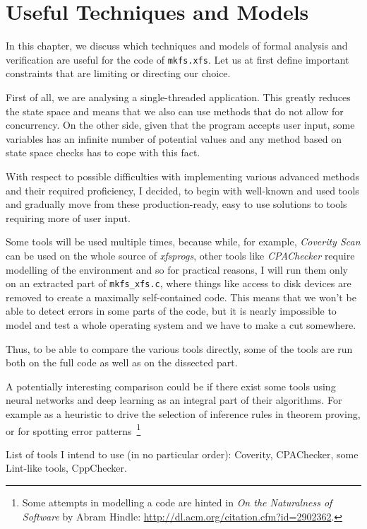 
\chapter{Useful Techniques and Models}\label{chap:techniques}
In this chapter, we discuss which techniques and models of formal analysis and verification are useful for the code of {\tt mkfs.xfs}. Let us at first define important constraints that are limiting or directing our choice.

First of all, we are analysing a single-threaded application. This greatly reduces the state space and means that we also can use methods that do not allow for concurrency. On the other side, given that the program accepts user input, some variables has an infinite number of potential values and any method based on state space checks has to cope with this fact.

With respect to possible difficulties with implementing various advanced methods and their required proficiency, I decided, to begin with well-known and used tools and gradually move from these production-ready, easy to use solutions to tools requiring more of user input.

Some tools will be used multiple times, because while, for example, {\em Coverity Scan} can be used on the whole source of {\em xfsprogs}, other tools like {\em CPAChecker} require modelling of the environment and so for practical reasons, I will run them only on an extracted part of {\tt mkfs\_xfs.c}, where things like access to disk devices are removed to create a maximally self-contained code. This means that we won't be able to detect errors in some parts of the code, but it is nearly impossible to model and test a whole operating system and we have to make a cut somewhere. 

Thus, to be able to compare the various tools directly, some of the tools are run both on the full code as well as on the dissected part.

A potentially interesting comparison could be if there exist some tools using neural networks and deep learning as an integral part of their algorithms. For example as a heuristic to drive the selection of inference rules in theorem proving, or for spotting error patterns~\footnote{Some attempts in modelling a code are hinted in {\em On the Naturalness of Software} by Abram Hindle: \url{http://dl.acm.org/citation.cfm?id=2902362}.}

List of tools I intend to use (in no particular order): Coverity, CPAChecker, some Lint-like tools, CppChecker.
